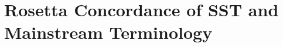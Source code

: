 \documentclass[11pt]{article}
\newcommand{\swirlarrow}{%
	\mathchoice{\mkern-2mu\scriptstyle\boldsymbol{\circlearrowleft}}%
	{\mkern-2mu\scriptstyle\boldsymbol{\circlearrowleft}}%
	{\mkern-2mu\scriptscriptstyle\boldsymbol{\circlearrowleft}}%
	{\mkern-2mu\scriptscriptstyle\boldsymbol{\circlearrowleft}}%
}
\newcommand{\vswirl}{\mathbf{v}_{\swirlarrow}}
\newcommand{\rhoF}{\rho_{\!f}}                           %
\providecommand{\rc}{r_c} %
\begin{document}
    \section{Rosetta Concordance of SST and Mainstream Terminology}

        \newcommand{\Circulation}{\kappa}
        \newcommand{\Umax}{U_{\max}}
        \newcommand{\Uloc}{U_{\text{swirl}}}
        \newcommand{\chiS}{\chi_{\text{swirl}}}


\end{document}
